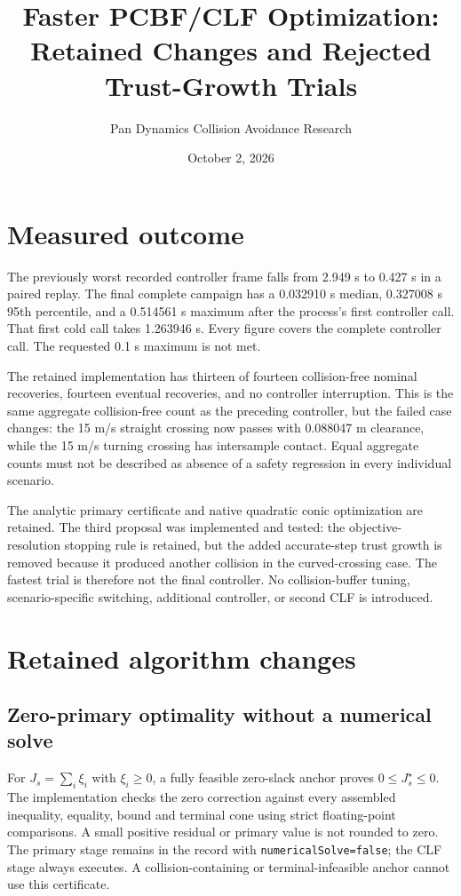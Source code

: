 \documentclass[11pt]{article}
\title{Faster PCBF/CLF Optimization: Retained Changes and Rejected Trust-Growth Trials}
\author{Pan Dynamics Collision Avoidance Research}
\date{October 2, 2026}
\begin{document}
\maketitle

\section{Measured outcome}
The previously worst recorded controller frame falls from 2.949 s to 0.427 s
in a paired replay. The final complete campaign has a 0.032910 s median,
0.327008 s 95th percentile, and a 0.514561 s maximum after the process's
first controller call. That first cold call takes 1.263946 s. Every figure
covers the complete controller call. The requested 0.1 s maximum is not met.

The retained implementation has thirteen of fourteen collision-free nominal
recoveries, fourteen eventual recoveries, and no controller interruption.
This is the same aggregate collision-free count as the preceding controller,
but the failed case changes: the 15 m/s straight crossing now passes with
0.088047 m clearance, while the 15 m/s turning crossing has intersample
contact. Equal aggregate counts must not be described as absence of a safety
regression in every individual scenario.

The analytic primary certificate and native quadratic conic optimization are
retained. The third proposal was implemented and tested: the objective-resolution
stopping rule is retained, but the added accurate-step trust growth is removed
because it produced another collision in the curved-crossing case. The fastest
trial is therefore not the final controller. No collision-buffer tuning,
scenario-specific switching, additional controller, or second CLF is introduced.

\section{Retained algorithm changes}
\subsection{Zero-primary optimality without a numerical solve}
For $J_s=\sum_i\xi_i$ with $\xi_i\ge0$, a fully feasible zero-slack anchor
proves $0\le J_s^\star\le0$. The implementation checks the zero correction
against every assembled inequality, equality, bound and terminal cone using
strict floating-point comparisons. A small positive residual or primary value
is not rounded to zero. The primary stage remains in the record with
\texttt{numericalSolve=false}; the CLF stage always executes. A collision-containing
or terminal-infeasible anchor cannot use this certificate.
\end{document}

